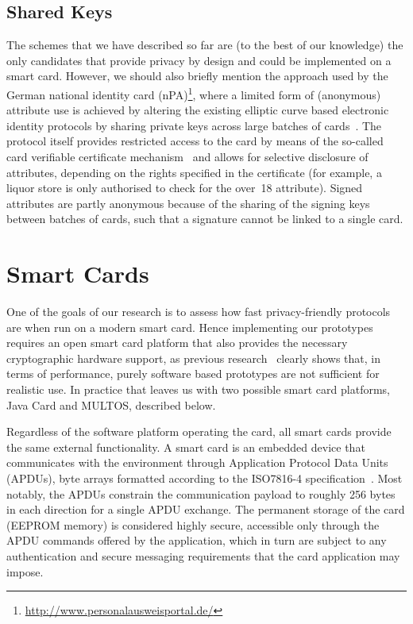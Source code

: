 \subsection{Shared Keys\label{sec:nPA}}

The schemes that we have described so far are (to the best of our knowledge) the
only candidates that provide privacy by design and could be implemented on a
smart card. However, we should also briefly mention the approach used by
the German national identity card (nPA)\footnote{%
\url{http://www.personalausweisportal.de/}}, where a limited form of (anonymous)
 attribute use is achieved by altering the existing
elliptic curve based electronic identity protocols by sharing private keys
 across large batches of cards~\cite{Kugler2010}. The
protocol itself provides restricted access to the card by means of the so-called
card verifiable certificate mechanism~\cite{EAC20} and allows for selective
disclosure of attributes, depending on the rights specified in the certificate
(for example, a liquor store is only authorised to check
for the \textsf{over~18} attribute). Signed attributes are partly anonymous
 because of the sharing of the signing keys between
batches of cards, such that a signature cannot be linked to a single card.

\section{Smart Cards\label{sec:smartcards}}

One of the goals of our research is to assess how fast privacy-friendly
protocols are when run on a modern smart card. Hence
implementing our prototypes requires an open smart card platform that also provides the necessary cryptographic hardware support,
as previous research~\cite{TewsJacobs09} clearly shows that, in terms of
performance, purely software based prototypes are not sufficient for realistic
use. In practice that leaves us with two possible smart card platforms, Java
Card and MULTOS, described below.

Regardless of the software platform operating the card, all smart cards provide
the same external functionality. A smart card is an embedded device that
communicates with the environment through Application Protocol Data Units
(APDUs), byte arrays formatted according to the ISO7816-4
specification~\cite{ISO7816_4}. Most notably, the APDUs constrain the
communication payload to roughly 256 bytes in each direction for a single APDU
exchange. The permanent storage of the card (EEPROM memory) is
considered highly secure, accessible only through the APDU commands offered by
the application, which in turn are subject to any authentication
 and secure messaging requirements that the card
application may impose.

